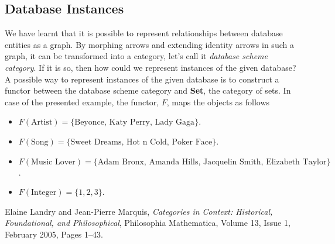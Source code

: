 \documentclass{report}
\theoremstyle{definition}
\begin{document}
\subsection*{Database Instances}
We have learnt that it is possible to represent relationships between database entities as a graph. By morphing arrows and extending identity arrows in such a graph, it can be transformed into a category, let's call it \emph{database scheme category}. If it is so, then how could we represent instances of the given database? A possible way to represent instances of the given database is to construct a functor between the database scheme category and \textbf{Set}, the category of sets. In case of the presented example, the functor, $F$, maps the objects as follows
\begin{itemize}
	\item $F(\text{Artist})=\{\text{Beyonce, Katy Perry, Lady Gaga}\}$.
	\item $F(\text{Song}) = \{\text{Sweet Dreams, Hot n Cold, Poker Face} \}$.
	\item $F(\text{Music Lover}) = \{\text{Adam Bronx, Amanda Hills, Jacquelin Smith, Elizabeth Taylor} \}$.
	\item $F(\text{Integer}) = \{1,2,3 \}$.
\end{itemize} 
\begin{thebibliography}{9}

Elaine Landry and Jean-Pierre Marquis,
\textit{Categories in Context: Historical, Foundational, and Philosophical},
Philosophia Mathematica, Volume 13, Issue 1, February 2005, Pages 1–43.
\end{thebibliography}
\end{document}

